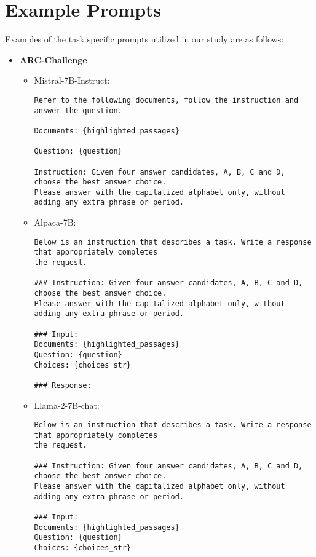 \section{Example Prompts}
\label{sec:appendix5}
Examples of the task specific prompts utilized in our study are as follows:
\small
\begin{itemize}
    \item \textbf{ARC-Challenge}
    \begin{itemize}
        \item Mistral-7B-Instruct:
        \begin{lstlisting}[basicstyle=\small\ttfamily,breaklines=true]
Refer to the following documents, follow the instruction and answer the question.

Documents: {highlighted_passages}

Question: {question}

Instruction: Given four answer candidates, A, B, C and D, choose the best answer choice.
Please answer with the capitalized alphabet only, without adding any extra phrase or period.
        \end{lstlisting}
        
        \item Alpaca-7B:
        \begin{lstlisting}[basicstyle=\small\ttfamily,breaklines=true]
Below is an instruction that describes a task. Write a response that appropriately completes
the request.

### Instruction: Given four answer candidates, A, B, C and D, choose the best answer choice.
Please answer with the capitalized alphabet only, without adding any extra phrase or period.

### Input:
Documents: {highlighted_passages}
Question: {question}
Choices: {choices_str}

### Response: 
        \end{lstlisting}

        \item Llama-2-7B-chat:
        \begin{lstlisting}[basicstyle=\small\ttfamily,breaklines=true]
Below is an instruction that describes a task. Write a response that appropriately completes
the request.

### Instruction: Given four answer candidates, A, B, C and D, choose the best answer choice.
Please answer with the capitalized alphabet only, without adding any extra phrase or period.

### Input:
Documents: {highlighted_passages}
Question: {question}
Choices: {choices_str}


\end{lstlisting}
\end{itemize}
\end{itemize}
